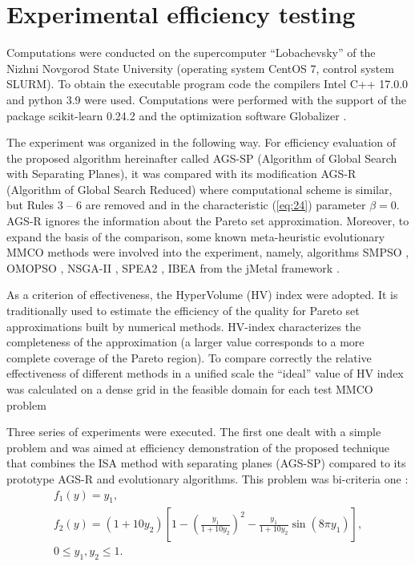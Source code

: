\documentclass[runningheads]{llncs}
\begin{document}
\section{Experimental efficiency testing}\label{sec:4}

Computations were conducted on the supercomputer ``Lobachevsky'' of the Nizhni Novgorod State University (operating system CentOS 7, control system SLURM). %
To obtain the executable program code the compilers Intel C++ 17.0.0 and python 3.9 were used. Computations were performed with the support of the package scikit-learn 0.24.2 and the optimization software Globalizer \cite{globalizerSystem}.

The experiment was organized in the following way. For efficiency evaluation of the proposed algorithm hereinafter called AGS-SP (Algorithm of Global Search with Separating Planes), it was compared with its modification AGS-R (Algorithm of Global Search Reduced) where computational scheme is similar, but Rules 3 -- 6 are removed and in the characteristic (\ref{eq:24}) parameter $\beta = 0$. AGS-R ignores the information about the Pareto set approximation. Moreover, to expand the basis of the comparison, some known meta-heuristic evolutionary MMCO methods were involved into the experiment, namely, algorithms SMPSO \cite{NDG09}, OMOPSO \cite{RC05}, NSGA-II \cite{DPA02}, SPEA2 \cite{ZLT01}, IBEA \cite{ZK04} from the jMetal framework \cite{DNA10}.

As a criterion of effectiveness, the HyperVolume (HV) index \cite{Evtushenko2014,Gergel2018} were adopted. It is traditionally used to estimate the efficiency of the quality for Pareto set approximations built by numerical methods. HV-index characterizes the completeness of the approximation (a larger value corresponds to a more complete coverage of the Pareto region). To compare correctly the relative effectiveness of different methods in a unified scale the ``ideal'' value of HV index was calculated on a dense grid in the feasible domain for each test MMCO problem

Three series of experiments were executed. The first one dealt with a simple problem and was aimed at efficiency demonstration of the proposed technique that combines the ISA method with separating planes (AGS-SP) compared to its prototype AGS-R and evolutionary algorithms.
This problem was bi-criteria one \cite{CHIANDUSSI2012912}:
\begin{equation}
    \label{eq:28}
    \begin{matrix}
f_1 (y)=y_1, \\
f_2 (y)=(1+10y_2 )[1- \left(\frac{y_1}{1+10y_2} \right)^2- \frac{y_1}{1+10y_2} \sin(8 \pi y_1 ) ], \\
0 \leq y_1,y_2 \leq 1.
    \end{matrix}
\end{equation}
\end{document}
